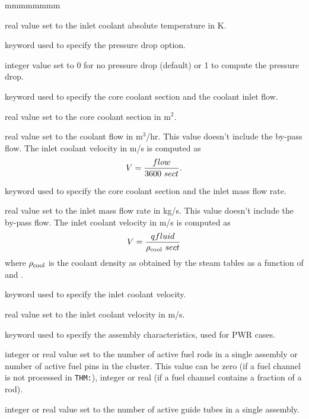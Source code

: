 \begin{ListeDeDescription}{mmmmmmmm}
\item[\dusa{tinlet}] real value set to the inlet coolant absolute temperature in K.

\item[\moc{PDROP}] keyword used to specify the pressure drop option.

\item[\dusa{ipres}] integer value set to 0 for no pressure drop (default) or 1 to compute the pressure drop.

\item[\moc{CWSECT}] keyword used to specify the core coolant section and the coolant inlet flow.

\item[\dusa{sect}] real value set to the core coolant section in m$^2$.

\item[\dusa{flow}] real value set to the coolant flow in m$^3$/hr. This value doesn't include the by-pass flow.
The inlet coolant velocity in m/s is computed as $$V={{\sl flow} \over 3600 \ {\sl sect}}.$$

\item[\moc{INLET-Q}] keyword used to specify the core coolant section and the inlet mass flow rate.

\item[\dusa{qfluid}] real value set to the inlet mass flow rate in kg/s. This value doesn't include the by-pass flow.
The inlet coolant velocity in m/s is computed as $$V={{\sl qfluid} \over \rho_{\rm cool} \ {\sl sect}}$$
\noindent where $\rho_{\rm cool}$ is the coolant density as obtained by the steam tables as a function of  and .

\item[\moc{SPEED}] keyword used to specify the inlet coolant velocity.

\item[\dusa{velocity}] real value set to the inlet coolant velocity in m/s.

\item[\moc{ASSMB}] keyword used to specify the assembly characteristics, used for PWR cases.

\item[\dusa{nbf}] integer or real value set to the number of active fuel rods in a single assembly or number of active fuel pins in the cluster. This value
can be zero (if a fuel channel is not processed in {\tt THM:}), integer or real (if a fuel channel contains a fraction of a rod).

\item[\dusa{nbg}] integer or real value set to the number of active guide tubes in a single assembly.


\end{ListeDeDescription}
